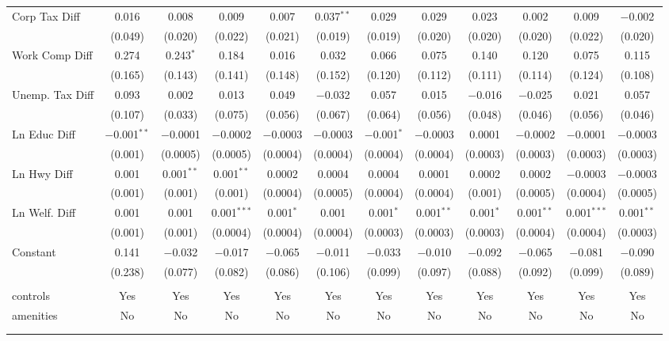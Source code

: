\begin{table}[!htbp]
\begin{tabular}{@{\extracolsep{5pt}}lccccccccccc}
  Corp Tax Diff & 0.016 & 0.008 & 0.009 & 0.007 & 0.037$^{**}$ & 0.029 & 0.029 & 0.023 & 0.002 & 0.009 & $-$0.002 \\ 
  & (0.049) & (0.020) & (0.022) & (0.021) & (0.019) & (0.019) & (0.020) & (0.020) & (0.020) & (0.022) & (0.020) \\ 
  Work Comp Diff & 0.274 & 0.243$^{*}$ & 0.184 & 0.016 & 0.032 & 0.066 & 0.075 & 0.140 & 0.120 & 0.075 & 0.115 \\ 
  & (0.165) & (0.143) & (0.141) & (0.148) & (0.152) & (0.120) & (0.112) & (0.111) & (0.114) & (0.124) & (0.108) \\ 
  Unemp. Tax Diff & 0.093 & 0.002 & 0.013 & 0.049 & $-$0.032 & 0.057 & 0.015 & $-$0.016 & $-$0.025 & 0.021 & 0.057 \\ 
  & (0.107) & (0.033) & (0.075) & (0.056) & (0.067) & (0.064) & (0.056) & (0.048) & (0.046) & (0.056) & (0.046) \\ 
  Ln Educ Diff & $-$0.001$^{**}$ & $-$0.0001 & $-$0.0002 & $-$0.0003 & $-$0.0003 & $-$0.001$^{*}$ & $-$0.0003 & 0.0001 & $-$0.0002 & $-$0.0001 & $-$0.0003 \\ 
  & (0.001) & (0.0005) & (0.0005) & (0.0004) & (0.0004) & (0.0004) & (0.0004) & (0.0003) & (0.0003) & (0.0003) & (0.0003) \\ 
  Ln Hwy Diff & 0.001 & 0.001$^{**}$ & 0.001$^{**}$ & 0.0002 & 0.0004 & 0.0004 & 0.0001 & 0.0002 & 0.0002 & $-$0.0003 & $-$0.0003 \\ 
  & (0.001) & (0.001) & (0.001) & (0.0004) & (0.0005) & (0.0004) & (0.0004) & (0.001) & (0.0005) & (0.0004) & (0.0005) \\ 
  Ln Welf. Diff & 0.001 & 0.001 & 0.001$^{***}$ & 0.001$^{*}$ & 0.001 & 0.001$^{*}$ & 0.001$^{**}$ & 0.001$^{*}$ & 0.001$^{**}$ & 0.001$^{***}$ & 0.001$^{**}$ \\ 
  & (0.001) & (0.001) & (0.0004) & (0.0004) & (0.0004) & (0.0003) & (0.0003) & (0.0003) & (0.0004) & (0.0004) & (0.0003) \\ 
  Constant & 0.141 & $-$0.032 & $-$0.017 & $-$0.065 & $-$0.011 & $-$0.033 & $-$0.010 & $-$0.092 & $-$0.065 & $-$0.081 & $-$0.090 \\ 
  & (0.238) & (0.077) & (0.082) & (0.086) & (0.106) & (0.099) & (0.097) & (0.088) & (0.092) & (0.099) & (0.089) \\ 
 \hline \\[-1.8ex] 
controls & Yes & Yes & Yes & Yes & Yes & Yes & Yes & Yes & Yes & Yes & Yes \\ 
amenities & No & No & No & No & No & No & No & No & No & No & No \\ 
\hline \\[-1.8ex] 
\hline 
\hline \\[-1.8ex] 
\end{tabular} 
\end{table} 
